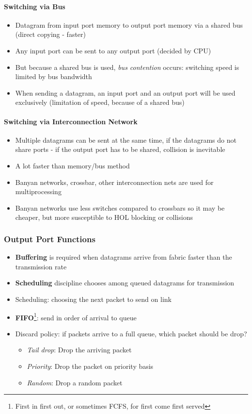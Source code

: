 \paragraph{Switching via Bus}
\begin{itemize}
	\item Datagram from input port memory to output port memory via a shared bus (direct copying - faster)
	\item Any input port can be sent to any output port (decided by CPU)
	\item But because a shared bus is used, \textit{bus contention} occurs: switching speed is limited by bus bandwidth
	\item When sending a datagram, an input port and an output port will be used exclusively (limitation of speed, because of a shared bus)
\end{itemize}

\paragraph{Switching via Interconnection Network}
\begin{itemize}
	\item Multiple datagrams can be sent at the same time, if the datagrams do not share ports - if the output port has to be shared, collision is inevitable
	\item A lot faster than memory/bus method
	\item Banyan networks, crossbar, other interconnection nets are used for multiprocessing
	\item Banyan networks use less switches compared to crossbars so it may be cheaper, but more susceptible to HOL blocking or collisions 
\end{itemize}

\subsubsection{Output Port Functions}
\begin{itemize}
	\item \textbf{Buffering} is required when datagrams arrive from fabric faster than the transmission rate
	\item \textbf{Scheduling} discipline chooses among queued datagrams for transmission
	\item Scheduling: choosing the next packet to send on link
	\item \textbf{FIFO}\footnote{First in first out, or sometimes FCFS, for first come first served}: send in order of arrival to queue
	\item Discard policy: if packets arrive to a full queue, which packet should be drop?
	\begin{itemize}
		\item \textit{Tail drop}: Drop the arriving packet
		\item \textit{Priority}: Drop the packet on priority basis
		\item \textit{Random}: Drop a random packet
	\end{itemize}
\end{itemize}

